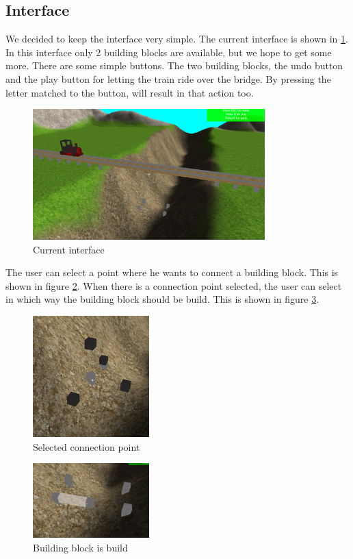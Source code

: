 \subsection{Interface}
We decided to keep the interface very simple. The current interface is shown in \ref{fig:gui}. In this interface only 2 building blocks are available, but we hope to get some more. There are some simple buttons. The two building blocks, the undo button and the play button for letting the train ride over the bridge. By pressing the letter matched to the button, will result in that action too.
\begin{figure}[H]
    \centering
    \includegraphics[width=0.8\textwidth]{screenshots/GUI.png}
    \caption{Current interface}
    \label{fig:gui}
\end{figure}
The user can select a point where he wants to connect a building block. This is shown in figure \ref{fig:scp}. When there is a connection point selected, the user can select in which way the building block should be build. This is shown in figure \ref{fig:builded}.
\begin{figure}[H]
    \centering
    \includegraphics[width=0.4\textwidth]{screenshots/select.png}
    \caption{Selected connection point}
    \label{fig:scp}
\end{figure}
\begin{figure}[H]
    \centering
    \includegraphics[width=0.4\textwidth]{screenshots/Builded.png}
    \caption{Building block is build}
    \label{fig:builded}
\end{figure}